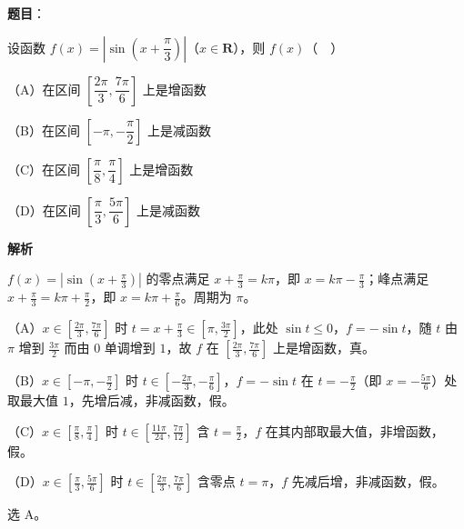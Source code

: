 \begin{answer}

\textbf{题目}：

设函数 $f(x)=\left|\sin\left(x+\dfrac{\pi}{3}\right)\right|$（$x\in\mathbf R$），则 $f(x)$（　）

（A）在区间 $\left[\dfrac{2\pi}{3},\dfrac{7\pi}{6}\right]$ 上是增函数

（B）在区间 $\left[-\pi,-\dfrac{\pi}{2}\right]$ 上是减函数

（C）在区间 $\left[\dfrac{\pi}{8},\dfrac{\pi}{4}\right]$ 上是增函数

（D）在区间 $\left[\dfrac{\pi}{3},\dfrac{5\pi}{6}\right]$ 上是减函数

\textbf{解析}

$f(x)=\left|\sin\left(x+\frac\pi3\right)\right|$ 的零点满足 $x+\frac\pi3=k\pi$，即 $x=k\pi-\frac\pi3$；峰点满足 $x+\frac\pi3=k\pi+\frac\pi2$，即 $x=k\pi+\frac\pi6$。周期为 $\pi$。

（A）$x\in\left[\frac{2\pi}3,\frac{7\pi}6\right]$ 时 $t=x+\frac\pi3\in\left[\pi,\frac{3\pi}2\right]$，此处 $\sin t\leqslant0$，$f=-\sin t$，随 $t$ 由 $\pi$ 增到 $\frac{3\pi}2$ 而由 $0$ 单调增到 $1$，故 $f$ 在 $\left[\frac{2\pi}3,\frac{7\pi}6\right]$ 上是增函数，真。

（B）$x\in\left[-\pi,-\frac\pi2\right]$ 时 $t\in\left[-\frac{2\pi}{3},-\frac\pi6\right]$，$f=-\sin t$ 在 $t=-\frac\pi2$（即 $x=-\frac{5\pi}6$）处取最大值 $1$，先增后减，非减函数，假。

（C）$x\in\left[\frac\pi8,\frac\pi4\right]$ 时 $t\in\left[\frac{11\pi}{24},\frac{7\pi}{12}\right]$ 含 $t=\frac\pi2$，$f$ 在其内部取最大值，非增函数，假。

（D）$x\in\left[\frac\pi3,\frac{5\pi}6\right]$ 时 $t\in\left[\frac{2\pi}3,\frac{7\pi}6\right]$ 含零点 $t=\pi$，$f$ 先减后增，非减函数，假。

选 A。


\end{answer}

